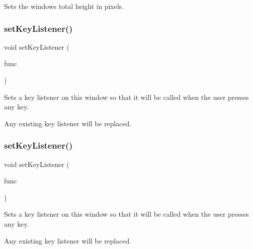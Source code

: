 Sets the window\textquotesingle{}s total height in pixels. 

\mbox{\label{classGWindow_aeb8324d3287fa1fbe093f4d6230cf0a6}} 
\subsubsection{\texorpdfstring{set\+Key\+Listener()}{setKeyListener()}\hspace{0.1cm}{\footnotesize\ttfamily [1/2]}}
{\footnotesize\ttfamily void set\+Key\+Listener (\begin{DoxyParamCaption}\item[{G\+Event\+Listener}]{func }\end{DoxyParamCaption})\hspace{0.3cm}{\ttfamily [virtual]}}



Sets a key listener on this window so that it will be called when the user presses any key. 

Any existing key listener will be replaced. \mbox{\label{classGWindow_ae48ecea73606c7bd9423e1c7cc589cc9}} 
\subsubsection{\texorpdfstring{set\+Key\+Listener()}{setKeyListener()}\hspace{0.1cm}{\footnotesize\ttfamily [2/2]}}
{\footnotesize\ttfamily void set\+Key\+Listener (\begin{DoxyParamCaption}\item[{G\+Event\+Listener\+Void}]{func }\end{DoxyParamCaption})\hspace{0.3cm}{\ttfamily [virtual]}}



Sets a key listener on this window so that it will be called when the user presses any key. 

Any existing key listener will be replaced. \mbox{\label{classGDrawingSurface_a6bfe14a77101db0fb97b5a7e07a5526b}} 
